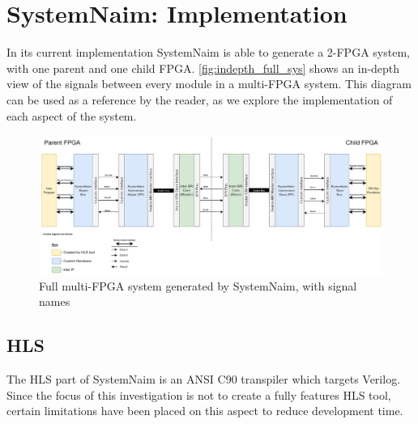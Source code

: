 \chapter{SystemNaim: Implementation}

In its current implementation SystemNaim is able to generate a 2-FPGA system, with one parent and one child FPGA. \autoref{fig:indepth_full_sys} shows an in-depth view of the signals between every module in a multi-FPGA system. This diagram can be used as a reference by the reader, as we explore the implementation of each aspect of the system.

\begin{figure}
    \centering
    \includegraphics[width=\textwidth]{04_Implementation/images/FGPA_Interface_block_diagram.png}
    \caption{Full multi-FPGA system generated by SystemNaim, with signal names}
    \label{fig:indepth_full_sys}
\end{figure}


\section{HLS}
\label{sec:hls_impl}

The HLS part of SystemNaim is an ANSI C90 transpiler which targets Verilog. Since the focus of this investigation is not to create a fully features HLS tool, certain limitations have been placed on this aspect to reduce development time.

